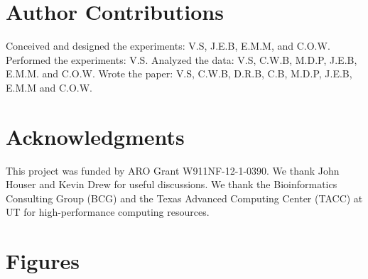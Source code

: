 \documentclass[12pt]{article}
\begin{document}

\section{Author Contributions}
Conceived and designed the experiments: V.S, J.E.B, E.M.M, and C.O.W. Performed the experiments: V.S. Analyzed the data: V.S, C.W.B, M.D.P, J.E.B, E.M.M. and C.O.W. Wrote the paper: V.S, C.W.B, D.R.B, C.B, M.D.P, J.E.B, E.M.M and C.O.W.

\section{Acknowledgments}
This project was funded by ARO Grant W911NF-12-1-0390. We thank John Houser and Kevin Drew for useful discussions. We thank the Bioinformatics Consulting Group (BCG) and the Texas Advanced Computing Center (TACC) at UT for high-performance computing resources. 




\newpage

\section*{Figures}
\end{document}

